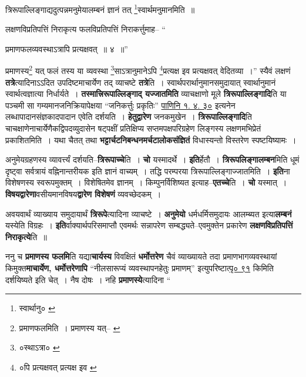 \documentclass[article,12pt,a4paper]{memoir}
\begin{document}
	त्रिरूपाल्लिङ्गाद्यदुत्पन्नमनुमेयालम्बनं ज्ञानं तत् \footnote{स्वार्थानु० \cite{dp-msD}}स्वार्थमनुमानमिति ॥ 
	  
	लक्षणविप्रतिपत्तिं निराकृत्य फलविप्रतिपत्तिं निराकर्त्तुमाह-- “
	  
	प्रमाणफलव्यवस्थाऽत्रापि प्रत्यक्षवत् ॥ ४ ॥” 
	  
	प्रमाणस्य\footnote{प्रमाणफलमिति । प्रमाणस्य यत्--\cite{dp-msB} \cite{dp-msC} \cite{dp-msD}} यत् फलं तस्य या व्यवस्था \footnote{०स्थाऽत्रा० \cite{dp-msA} \cite{dp-msB} \cite{dp-edP} \cite{dp-edH} \cite{dp-edE}}साऽत्रानुमानेऽपि \footnote{०पि प्रत्यक्षवत् प्रत्यक्ष इव \cite{dp-edP} \cite{dp-edH} \cite{dp-edE}}प्रत्यक्ष इव प्रत्यक्षवत् वेदितव्या ।” स्यैवं लक्षणं \textbf{तत्रे}त्यादिनाऽऽदित उपदिष्टमाचार्येण तद् व्याचष्टे \textbf{तत्रे}ति । स्वार्थपरार्थानुमानसमुदायात् स्वार्थानुमानं स्वार्थत्वज्ञात्या निर्धार्यते । \textbf{तस्मात्त्रिरूपाल्लिङ्गाद् यज्जातमिति} व्याचक्षाणो मूले \textbf{त्रिरूपाल्लिङ्गादि}ति या पञ्चमी सा गम्यमानजनिक्रियापेक्षया “जनिकर्त्तुः प्रकृतिः” \href{http://http://sarit.indology.info/?cref=Pā.1.4.30}{पाणिनि १. ४. ३०} इत्यनेन लब्धापादानसंज्ञकादपादान एवेति दर्शयति । \textbf{हेतुद्वारेण} जनकमुखेन । \textbf{त्रिरूपाल्लिङ्गादि}ति चाचक्षाणेनाचार्येणैकद्विपदव्युदासेन षट्पक्षीं प्रतिक्षिप्य सप्तमपक्षपरिग्रहेण लिङ्गस्य लक्षणमभिप्रेतं प्रकाशितमिति । यथा चैतत् तथा \textbf{भट्टार्चटनिबन्धनमर्चटालोकसंज्ञितं} विधास्यन्तो विस्तरेण स्पष्टयिष्यामः ।
	\pend
      

	  \pstart अनुमेयग्रहणस्य व्यावर्त्त्यं दर्शयति--\textbf{त्रिरूपाच्चे}ति । \textbf{चो} यस्मादर्थे । \textbf{इति}र्हेतौ । \textbf{त्रिरूपलिङ्गालम्बन}मिति धूमं दृष्ट्वा सर्वत्रायं वह्निनान्तरीयक इति ज्ञानं वाच्यम् । तद्धि परम्परया त्रिरूपाल्लिङ्गाज्जातमिति । \textbf{इति}ना विशेषणस्य स्वरूपमुक्तम् । विशेषितमेव ज्ञानम् । किम्पुनर्विशिष्यत इत्याह--\textbf{एतच्चे}ति । \textbf{चो} यस्मात् । \textbf{विषयद्वारेणा}वसीयमानविषय\textbf{द्वारेण विशेषणं} व्यवच्छेदकम् ।
	\pend
      

	  \pstart अवयवार्थं व्याख्याय समुदायार्थं \textbf{त्रिरूपे}त्यादिना व्याचष्टे । \textbf{अनुमेयो} धर्मधर्मिसमुदायः आलम्ब्यत इत्या\textbf{लम्बनं} यस्येति विग्रहः । \textbf{इति}र्वाक्यार्थपरिसमाप्तौ एवमर्थः सन्नापरेण सम्बद्ध्यते--एवमुक्तेन प्रकारेण \textbf{लक्षणविप्रतिपत्तिं निराकृत्ये}ति ॥
	\pend
      

	  \pstart ननु च \textbf{प्रमाणस्य फलमि}ति यद्या\textbf{चार्यस्य} विवक्षितं \textbf{धर्मोत्तरेण} चैवं व्याख्यायते तदा प्रमाणभागव्यवस्थायां किमुक्त\textbf{माचार्येण, धर्मोत्तरेणापि} “नीलसारूप्यं व्यवस्थापनहेतुः प्रमाणम्” इत्युपरिष्टात्\href{http://http://sarit.indology.info/?cref=p91}{पृ० ९१} किमिति दर्शयिष्यते इति चेत् । नैष दोषः । नहि \textbf{प्रमाणस्ये}त्यादिना  \leavevmode{} “
	  
\end{document}
